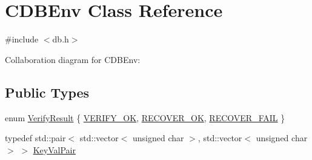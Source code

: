 \hypertarget{class_c_d_b_env}{}\section{C\+D\+B\+Env Class Reference}
\label{class_c_d_b_env}


{\ttfamily \#include $<$db.\+h$>$}



Collaboration diagram for C\+D\+B\+Env\+:
\subsection*{Public Types}
\begin{DoxyCompactItemize}
\item 
enum \hyperlink{class_c_d_b_env_a6fbf26da5d7f8f64a77a3ba15e4df244}{Verify\+Result} \{ \hyperlink{class_c_d_b_env_a6fbf26da5d7f8f64a77a3ba15e4df244ad1e78ccddf6bdf55ecf09d6936760661}{V\+E\+R\+I\+F\+Y\+\_\+\+O\+K}, 
\hyperlink{class_c_d_b_env_a6fbf26da5d7f8f64a77a3ba15e4df244a25eebe1e7f52e4e07a4c9b1e6abc4274}{R\+E\+C\+O\+V\+E\+R\+\_\+\+O\+K}, 
\hyperlink{class_c_d_b_env_a6fbf26da5d7f8f64a77a3ba15e4df244a0c9f58677b786e700258e8ad29579d75}{R\+E\+C\+O\+V\+E\+R\+\_\+\+F\+A\+I\+L}
 \}
\item 
typedef std\+::pair$<$ std\+::vector$<$ unsigned char $>$, std\+::vector$<$ unsigned char $>$ $>$ \hyperlink{class_c_d_b_env_a53fd285f09c312973caa6f90b33937f5}{Key\+Val\+Pair}
\end{DoxyCompactItemize}
